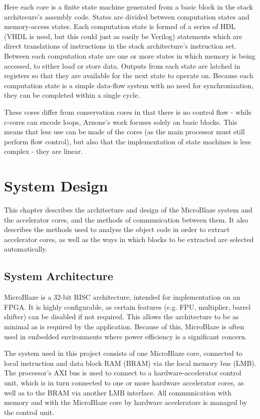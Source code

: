 \documentclass{UoYCSproject}
\begin{document}
Here each core is a finite state machine generated from a basic block in the stack architecure's
assembly code. States are divided between computation states and memory-access states. Each computation state
is formed of a series of HDL (VHDL is used, but this could just as easily be Verilog) statements which are direct
translations of instructions in the stack architecture's instruction set. Between each computation state are one
or more states in which memory is being accessed, to either load or store data. Outputs from each state are latched
in registers so that they are available for the next state to operate on. Because each computation state is a simple
data-flow system with no need for synchronization, they can be completed within a single cycle.

These cores differ from conservation cores in that there is no control flow - while c-cores can encode loops, Arnone's
work focuses solely on basic blocks. This means that less use can be made of the cores (as the main processor must still
perform flow control), but also that the implementation of state machines is less complex - they are linear.

\chapter{System Design}

This chapter describes the architecture and design of the MicroBlaze system and the accelerator cores, and the
methods of communication between them. It also describes the methods used to analyse the object code in order to
extract accelerator cores, as well as the ways in which blocks to be extracted are selected automatically.

\section{System Architecture}

MicroBlaze \cite{microblaze} is a 32-bit RISC architecture, intended for implementation on an FPGA.
It is highly configurable, as certain features (e.g. FPU, multiplier, barrel shifter) can be disabled if not required.
This allows the architecture to be as minimal as is required by the application. Because of this, MicroBlaze is often used in
embedded environments where power efficiency is a significant concern.

The system used in this project consists of one MicroBlaze core, connected to local instruction and data block RAM (BRAM)
via the local memory bus (LMB). The processor's AXI bus is used to connect to a hardware-accelerator control unit, which is
in turn connected to one or more hardware accelerator cores, as well as to the BRAM via another LMB interface.
All communication with memory and with the MicroBlaze core by hardware accelerators is managed by the control unit.
\end{document}
